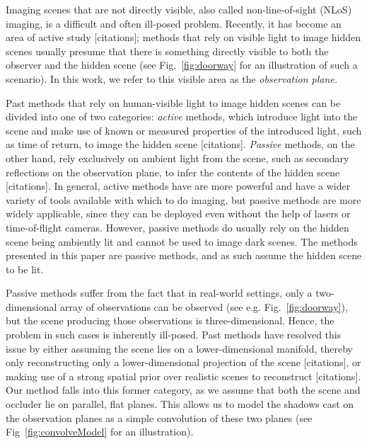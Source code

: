 Imaging scenes that are not directly visible, also called non-line-of-sight (NLoS) imaging, is a difficult and often ill-posed problem. Recently, it has become an area of active study [citations]; methods that rely on visible light to image hidden scenes usually presume that there is something directly visible to both the observer and the hidden scene (see Fig.~\ref{fig:doorway} for an illustration of such a scenario). In this work, we refer to this visible area as the \emph{observation plane.} 

Past methods that rely on human-visible light to image hidden scenes can be divided into one of two categories: \emph{active} methods, which introduce light into the scene and make use of known or measured properties of the introduced light, such as time of return, to image the hidden scene [citations]. \emph{Passive} methods, on the other hand, rely exclusively on ambient light from the scene, such as secondary reflections on the observation plane, to infer the contents of the hidden scene [citations]. In general, active methods have are more powerful and have a wider variety of tools available with which to do imaging, but passive methods are more widely applicable, since they can be deployed even without the help of lasers or time-of-flight cameras. However, passive methods do usually rely on the hidden scene being ambiently lit and cannot be used to image dark scenes. The methods presented in this paper are passive methods, and as such assume the hidden scene to be lit.

Passive methods suffer from the fact that in real-world settings, only a two-dimensional array of observations can be observed (see e.g. Fig.~\ref{fig:doorway}), but the scene producing those observations is three-dimensional. Hence, the problem in such cases is inherently ill-posed. Past methods have resolved this issue by either assuming the scene lies on a lower-dimensional manifold, thereby only reconstructing only a lower-dimensional projection of the scene [citations], or making use of a strong spatial prior over realistic scenes to reconstruct [citations]. Our method falls into this former category, as we assume that both the scene and occluder lie on parallel, flat planes. This allows us to model the shadows cast on the observation planes as a simple convolution of these two planes (see Fig~\ref{fig:convolveModel} for an illustration).

